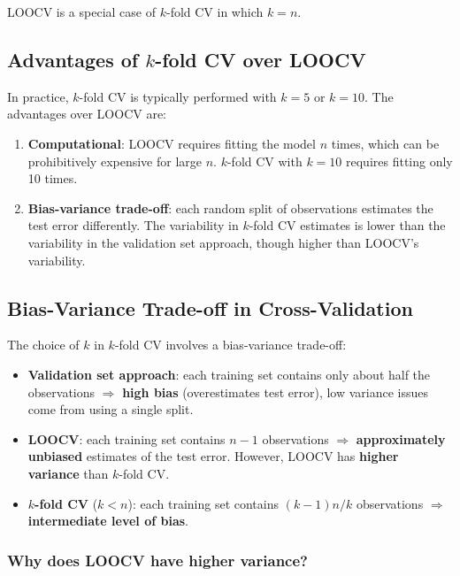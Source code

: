 \documentclass[11pt,a4paper]{article}
\theoremstyle{definition}
\theoremstyle{plain}
\theoremstyle{remark}
\begin{document}
LOOCV is a special case of $k$-fold CV in which $k = n$.

\subsection{Advantages of \texorpdfstring{$k$}{k}-fold CV over LOOCV}

In practice, $k$-fold CV is typically performed with $k = 5$ or $k = 10$. The advantages over LOOCV are:

\begin{enumerate}
    \item \textbf{Computational}: LOOCV requires fitting the model $n$ times, which can be prohibitively expensive for large $n$. $k$-fold CV with $k = 10$ requires fitting only 10 times.
    \item \textbf{Bias-variance trade-off}: each random split of observations estimates the test error differently. The variability in $k$-fold CV estimates is lower than the variability in the validation set approach, though higher than LOOCV's variability.
\end{enumerate}

\subsection{Bias-Variance Trade-off in Cross-Validation}

The choice of $k$ in $k$-fold CV involves a bias-variance trade-off:

\begin{itemize}
    \item \textbf{Validation set approach}: each training set contains only about half the observations $\Rightarrow$ \textbf{high bias} (overestimates test error), low variance issues come from using a single split.
    \item \textbf{LOOCV}: each training set contains $n-1$ observations $\Rightarrow$ \textbf{approximately unbiased} estimates of the test error. However, LOOCV has \textbf{higher variance} than $k$-fold CV.
    \item \textbf{$k$-fold CV} ($k < n$): each training set contains $(k-1)n/k$ observations $\Rightarrow$ \textbf{intermediate level of bias}.
\end{itemize}

\subsubsection{Why does LOOCV have higher variance?}
\end{document}
